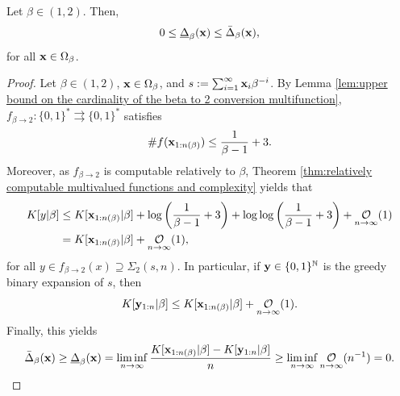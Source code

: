 \begin{corollary}\label{cor:binary expansions are at least as compressible as as beta expansions}
    Let $\beta \in (1,2)$. Then,
		\begin{equation}
			0 \leq \underline\Delta_\beta({\bf x}) \leq \bar\Delta_\beta({\bf x}),
		\end{equation}
		for all ${\bf x} \in \Omega_\beta$.
\end{corollary}
\begin{proof}
    Let $\beta \in (1,2)$, ${\bf x} \in \Omega_\beta$, and $s := \sum_{i=1}^\infty {\bf x}_i \beta^{-i}$. By Lemma \ref{lem:upper bound on the cardinality of the beta to 2 conversion multifunction}, $f_{\beta \to 2} : \{0,1\}^\ast  \rightrightarrows \{0,1\}^\ast$ satisfies
    \begin{equation}
        \#f({\bf x}_{1:n(\beta)}) \leq \frac{1}{\beta-1} + 3.
    \end{equation}
    Moreover, as $f_{\beta \to 2}$ is computable relatively to $\beta$, Theorem \ref{thm:relatively computable multivalued functions and complexity} yields that 
    \begin{align}
        K[y|\beta] &\leq K[\xf_{1:\nlogbeta}|\beta] + \log \left(\frac{1}{\beta-1} + 3\right) + \log\log \left(\frac{1}{\beta-1} + 3\right) + \bigOx[1]{n}\\
        &= K[\xf_{1:\nlogbeta}|\beta] + \bigOx[1]{n},
    \end{align}
    for all $y \in f_{\beta \to 2}(x) \supseteq \Sigma_2(s,n)$. In particular, if ${\bf y} \in \{0,1\}^{\mathbb{N}}$ is the greedy binary expansion of $s$, then 
    \begin{equation}
        K[\yf_{1:n}|\beta] \leq K[\xf_{1:\nlogbeta}|\beta] + \bigOx[1]{n}.
    \end{equation}
    Finally, this yields
    \begin{equation}
        \bar{\Delta}_{\beta}(\xf) \geq \underline{\Delta}_{\beta}(\xf) = \liminf_{n\to \infty} \frac{K[\xf_{1:\nlogbeta}|\beta] - K[\yf_{1:n}|\beta]}{n} \geq \liminf_{n\to \infty}\bigOx[n^{-1}]{n} = 0.
    \end{equation}
\end{proof}
